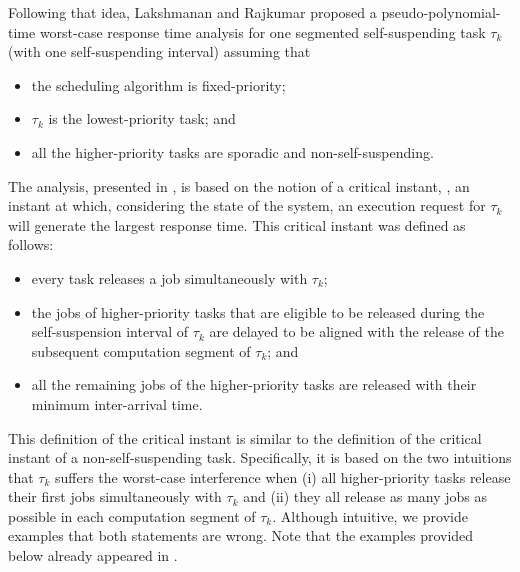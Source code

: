Following that idea, Lakshmanan and Rajkumar \cite{LR:rtas10} proposed a pseudo-polynomial-time worst-case response time analysis for one segmented self-suspending task $\tau_k$ (with one self-suspending interval) assuming that 
\begin{itemize}
\item the scheduling algorithm is fixed-priority;
\item $\tau_k$ is the lowest-priority task;  and
\item all the higher-priority tasks are sporadic and non-self-suspending.
\end{itemize}
The analysis, presented in \cite{LR:rtas10}, is based on the notion of
a critical instant, \ie, an instant at which, considering the state of the system, an execution request for $\tau_k$ will generate the largest response time. This critical instant was defined as follows:
\begin{itemize}
	\item every task releases a job simultaneously with $\tau_k$;
	\item the jobs of higher-priority tasks that are eligible to be released during the self-suspension interval of $\tau_k$ are delayed to be aligned with the release of the subsequent computation segment of $\tau_k$; and
	\item all the remaining jobs of the higher-priority tasks are released with their minimum inter-arrival time.
\end{itemize}

This definition of the critical instant is similar to the definition of the critical instant of a non-self-suspending task. Specifically, it is based on the two intuitions that $\tau_k$ suffers the worst-case interference when (i) all higher-priority tasks release their first jobs simultaneously with $\tau_k$ and (ii) they all release as many jobs as possible in each computation segment of $\tau_k$. Although intuitive, we provide examples that both statements are wrong. Note that the examples provided below already appeared in \cite{ecrts15nelissen}.



